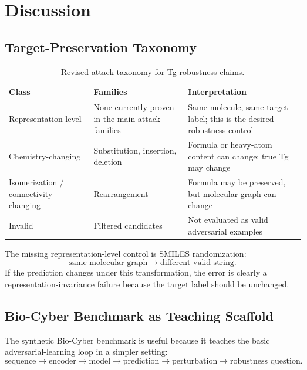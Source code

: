 \documentclass[11pt]{article}
\begin{document}
\section{Discussion}

\subsection{Target-Preservation Taxonomy}

\begin{table}[H]
\centering
\caption{Revised attack taxonomy for Tg robustness claims.}
\begin{tabularx}{\textwidth}{@{}lXX@{}}
\toprule
Class & Families & Interpretation \\
\midrule
Representation-level & None currently proven in the main attack families & Same molecule, same target label; this is the desired robustness control \\
Chemistry-changing & Substitution, insertion, deletion & Formula or heavy-atom content can change; true Tg may change \\
Isomerization / connectivity-changing & Rearrangement & Formula may be preserved, but molecular graph can change \\
Invalid & Filtered candidates & Not evaluated as valid adversarial examples \\
\bottomrule
\end{tabularx}
\end{table}

The missing representation-level control is SMILES randomization:
\[
\text{same molecular graph} \rightarrow \text{different valid string}.
\]
If the prediction changes under this transformation, the error is clearly a
representation-invariance failure because the target label should be unchanged.

\subsection{Bio-Cyber Benchmark as Teaching Scaffold}

The synthetic Bio-Cyber benchmark is useful because it teaches the basic
adversarial-learning loop in a simpler setting:
\[
\text{sequence} \rightarrow \text{encoder} \rightarrow \text{model}
\rightarrow \text{prediction} \rightarrow \text{perturbation}
\rightarrow \text{robustness question}.
\]
\end{document}

